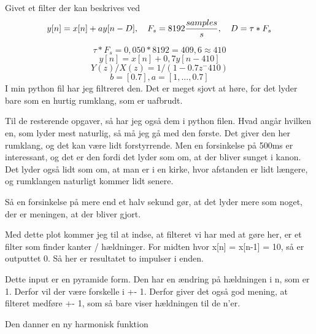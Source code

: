 \begin{Opgaver}
\begin{kapitel}
        \begin{Opgave}
            Givet et filter der kan beskrives ved 
            \[y[n] = x[n] + ay[n - D], \tab{0} F_s = 8192 \frac{samples}{s}, \tab{0} D = \tau * F_s\]
            \begin{UnderOpgave}[For $\tau = 50ms,\tab{0} a = 0,7$ beskriv filteret og brug den til at processere handel lydfilen.]
                \[\tau*F_s = 0,050*8192 = 409,6 \approx 410\] 
                \[y[n] = x[n] + 0,7y[n - 410]\]
                \[Y(z)/X(z) = 1/(1 - 0.7z^-410)\]
                \[b = [0.7], a = [1, ..., 0.7]\]
                I min python fil har jeg filtreret den. Det er meget sjovt at høre, for det lyder bare som en hurtig rumklang, som er uafbrudt.
            \end{UnderOpgave}
            Til de resterende opgaver, så har jeg også dem i python filen. Hvad angår hvilken en, som lyder mest naturlig, så må jeg gå med den første.
            Det giver den her rumklang, og det kan være lidt forstyrrende. 
            Men en forsinkelse på 500ms er interessant, og det er den fordi det lyder som om, at der bliver sunget i kanon.
            Det lyder også lidt som om, at man er i en kirke, hvor afstanden er lidt længere, og rumklangen naturligt kommer lidt senere.

            Så en forsinkelse på mere end et halv sekund gør, at det lyder mere som noget, der er meningen, at der bliver gjort.            
        \end{Opgave}

        \begin{Opgave}
            \begin{UnderOpgave}[\text{$x[n] = 10*(u[n+10] - u[n-20])$}]
                Med dette plot kommer jeg til at indse, at filteret vi har med at gøre her, 
                er et filter som finder kanter / hældninger. For midten hvor x[n] = x[n-1] = 10, så er outputtet 0.
                Så her er resultatet to impulser i enden.
            \end{UnderOpgave}
            \begin{UnderOpgave}[\text{$n(u[n] - u[n-10]) + (20 - n) * (u[n-10] - u[n-20])$}]
                Dette input er en pyramide form. Den har en ændring på hældningen i n, som er 1. Derfor vil der være forskelle i +- 1. 
                Derfor giver det også god mening, at filteret medføre +- 1, som så bare viser hældningen til de n'er. 
            \end{UnderOpgave}
            \begin{UnderOpgave}
                Den danner en ny harmonisk funktion
            \end{UnderOpgave}
        \end{Opgave}


\end{kapitel}
\end{Opgaver}
